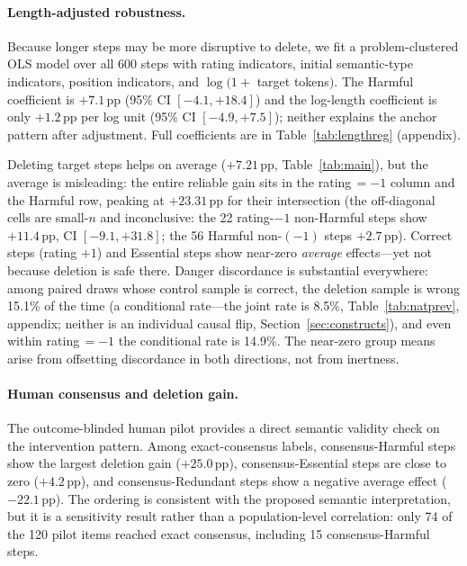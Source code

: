 \documentclass[11pt]{article}
\newcommand{\ci}[2]{[#1, #2]}
\begin{document}
\paragraph{Length-adjusted robustness.}
Because longer steps may be more disruptive to delete, we fit a problem-clustered OLS model over all 600 steps with rating indicators, initial semantic-type indicators, position indicators, and $\log(1+$ target tokens$)$. The Harmful coefficient is $+7.1$\,pp (95\% CI $[-4.1,+18.4]$) and the log-length coefficient is only $+1.2$\,pp per log unit (95\% CI $[-4.9,+7.5]$); neither explains the anchor pattern after adjustment. Full coefficients are in Table~\ref{tab:lengthreg} (appendix).

Deleting target steps helps on average ($+7.21$\,pp, Table~\ref{tab:main}), but the average is misleading: the entire reliable gain sits in the rating\,$=-1$ column and the Harmful row, peaking at $+23.31$\,pp for their intersection (the off-diagonal cells are small-$n$ and inconclusive: the 22 rating-$-1$ non-Harmful steps show $+11.4$\,pp, CI $\ci{-9.1}{+31.8}$; the 56 Harmful non-$(-1)$ steps $+2.7$\,pp). Correct steps (rating $+1$) and Essential steps show near-zero \emph{average} effects---yet not because deletion is safe there. Danger discordance is substantial everywhere: among paired draws whose control sample is correct, the deletion sample is wrong 15.1\% of the time (a conditional rate---the joint rate is 8.5\%, Table~\ref{tab:natprev}, appendix; neither is an individual causal flip, Section~\ref{sec:constructs}), and even within rating\,$=-1$ the conditional rate is 14.9\%. The near-zero group means arise from offsetting discordance in both directions, not from inertness.

\paragraph{Human consensus and deletion gain.}
The outcome-blinded human pilot provides a direct semantic validity check on the intervention pattern. Among exact-consensus labels, consensus-Harmful steps show the largest deletion gain ($+25.0$\,pp), consensus-Essential steps are close to zero ($+4.2$\,pp), and consensus-Redundant steps show a negative average effect ($-22.1$\,pp). The ordering is consistent with the proposed semantic interpretation, but it is a sensitivity result rather than a population-level correlation: only 74 of the 120 pilot items reached exact consensus, including 15 consensus-Harmful steps.
\end{document}
